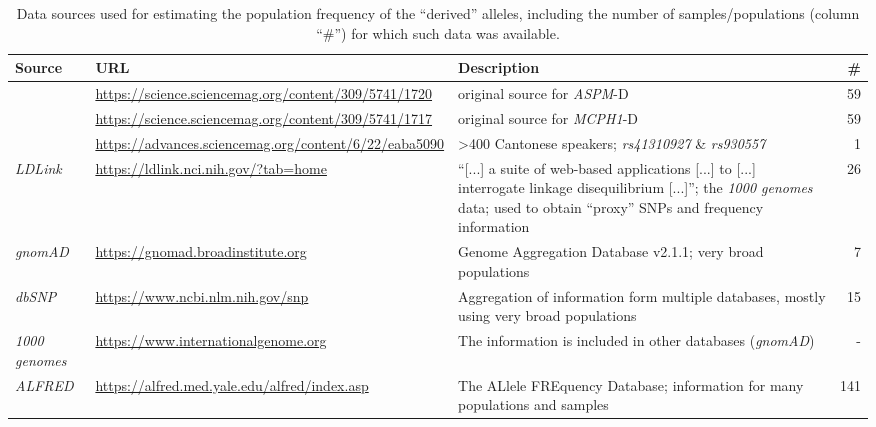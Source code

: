 \documentclass[twoside,onecolumn]{article}
\begin{document}
\begin{table}[h]
	\caption{Data sources used for estimating the population frequency of the ``derived'' alleles, including the number of samples/populations (column ``\#'') for which such data was available.}
	\label{Tab:gene_data_sources}
	\centering
	\begin{tabularx}{\textwidth}{|X|X|X|r|}
		\toprule
		\textbf{Source} & \textbf{URL} & \textbf{Description} & \textbf{\#} \\
		\midrule
		\citet{mekelbobrov_aspm_2005} & \url{https://science.sciencemag.org/content/309/5741/1720} & original source for \textit{ASPM}-D & 59 \\
		\citet{evans_microcephalin_2005} & \url{https://science.sciencemag.org/content/309/5741/1717} & original source for \textit{MCPH1}-D & 59 \\
		\citet{wong_sciadv_2020} & \url{https://advances.sciencemag.org/content/6/22/eaba5090} & >400 Cantonese speakers; \textit{rs41310927} \& \textit{rs930557} & 1 \\
		\textit{LDLink} & \url{https://ldlink.nci.nih.gov/?tab=home} & ``[...] a suite of web-based applications [...] to [...] interrogate linkage disequilibrium [...]''; the \textit{1000 genomes} data; used to obtain ``proxy'' SNPs and frequency information & 26 \\
		\textit{gnomAD} & \url{https://gnomad.broadinstitute.org} & Genome Aggregation Database v2.1.1; very broad populations & 7 \\
		\textit{dbSNP} & \url{https://www.ncbi.nlm.nih.gov/snp} & Aggregation of information form multiple databases, mostly using very broad populations & 15 \\
		\textit{1000 genomes} & \url{https://www.internationalgenome.org} & The information is included in other databases (\textit{gnomAD}) & - \\
		\textit{ALFRED} &	\url{https://alfred.med.yale.edu/alfred/index.asp} & The ALlele FREquency Database; information for many populations and samples & 141 \\
		\bottomrule
	\end{tabularx}
\end{table}
\end{document}
